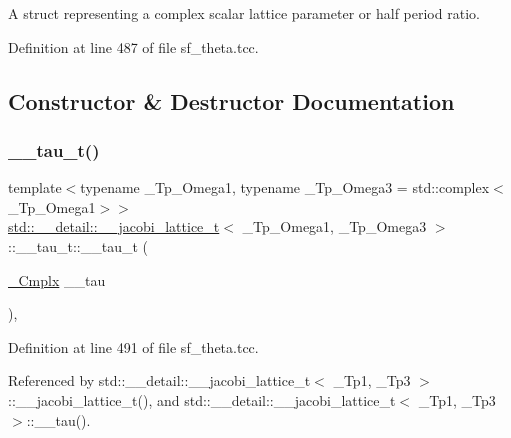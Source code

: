 A struct representing a complex scalar lattice parameter or half period ratio. 

Definition at line 487 of file sf\+\_\+theta.\+tcc.



\subsection{Constructor \& Destructor Documentation}
\mbox{\label{structstd_1_1____detail_1_1____jacobi__lattice__t_1_1____tau__t_a041ffb1c096223852676b8928df6192b}} 
\subsubsection{\texorpdfstring{\+\_\+\+\_\+tau\+\_\+t()}{\_\_tau\_t()}}
{\footnotesize\ttfamily template$<$typename \+\_\+\+Tp\+\_\+\+Omega1, typename \+\_\+\+Tp\+\_\+\+Omega3 = std\+::complex$<$\+\_\+\+Tp\+\_\+\+Omega1$>$$>$ \\
\hyperlink{structstd_1_1____detail_1_1____jacobi__lattice__t}{std\+::\+\_\+\+\_\+detail\+::\+\_\+\+\_\+jacobi\+\_\+lattice\+\_\+t}$<$ \+\_\+\+Tp\+\_\+\+Omega1, \+\_\+\+Tp\+\_\+\+Omega3 $>$\+::\+\_\+\+\_\+tau\+\_\+t\+::\+\_\+\+\_\+tau\+\_\+t (\begin{DoxyParamCaption}\item[{\hyperlink{structstd_1_1____detail_1_1____jacobi__lattice__t_a77e286c37544d6ba5e4fb5542d3aad5f}{\+\_\+\+Cmplx}}]{\+\_\+\+\_\+tau }\end{DoxyParamCaption})\hspace{0.3cm}{\ttfamily [inline]}, {\ttfamily [explicit]}}



Definition at line 491 of file sf\+\_\+theta.\+tcc.



Referenced by std\+::\+\_\+\+\_\+detail\+::\+\_\+\+\_\+jacobi\+\_\+lattice\+\_\+t$<$ \+\_\+\+Tp1, \+\_\+\+Tp3 $>$\+::\+\_\+\+\_\+jacobi\+\_\+lattice\+\_\+t(), and std\+::\+\_\+\+\_\+detail\+::\+\_\+\+\_\+jacobi\+\_\+lattice\+\_\+t$<$ \+\_\+\+Tp1, \+\_\+\+Tp3 $>$\+::\+\_\+\+\_\+tau().



